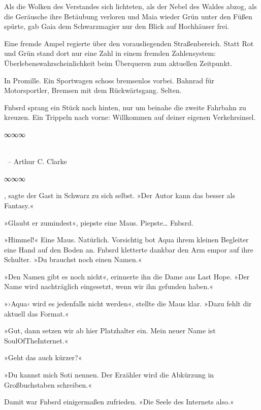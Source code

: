 Als die Wolken des Verstandes sich lichteten, als der Nebel des Waldes abzog, als die Geräusche ihre Betäubung verloren und Maia wieder Grün unter den Füßen spürte, gab Gaia dem Schwarzmagier nur den Blick auf Hochhäuser frei.

Eine fremde Ampel regierte über den vorausliegenden Straßenbereich. Statt Rot und Grün stand dort nur eine Zahl in einem fremden Zahlensystem: Überlebenswahrscheinlichkeit beim Überqueren zum aktuellen Zeitpunkt.

In Promille. Ein Sportwagen schoss bremsenlos vorbei. Bahnrad für Motorsportler, Bremsen mit dem Rückwärtsgang. Selten.

Fnbsrd sprang ein Stück nach hinten, nur um beinahe die zweite Fahrbahn zu kreuzen. Ein Trippeln nach vorne: Willkommen auf deiner eigenen Verkehrsinsel.

\begin{center}
∞∞∞
\end{center}

\noindent {}\\
\noindent~– Arthur C. Clarke

\begin{center}
∞∞∞
\end{center}

, sagte der Gast in Schwarz zu sich selbst. »Der Autor kann das besser als Fantasy.«

»Glaubt er zumindest«, piepste eine Maus. Piepste… Fnbsrd.

»Himmel!« Eine Maus. Natürlich. Vorsichtig bot Aqua ihrem kleinen Begleiter eine Hand auf den Boden an. Fnbsrd kletterte dankbar den Arm empor auf ihre Schulter. »Du brauchst noch einen Namen.«

»Den Namen gibt es noch nicht«, erinnerte ihn die Dame aus Last Hope. »Der Name wird nachträglich eingesetzt, wenn wir ihn gefunden haben.«

»›Aqua‹ wird es jedenfalls nicht werden«, stellte die Maus klar. »Dazu fehlt dir aktuell das Format.«

»Gut, dann setzen wir ab hier Platzhalter ein. Mein neuer Name ist SoulOfTheInternet.«

»Geht das auch kürzer?«

»Du kannst mich Soti nennen. Der Erzähler wird die Abkürzung in Großbuchstaben schreiben.«

Damit war Fnbsrd einigermaßen zufrieden. »Die Seele des Internets also.«

